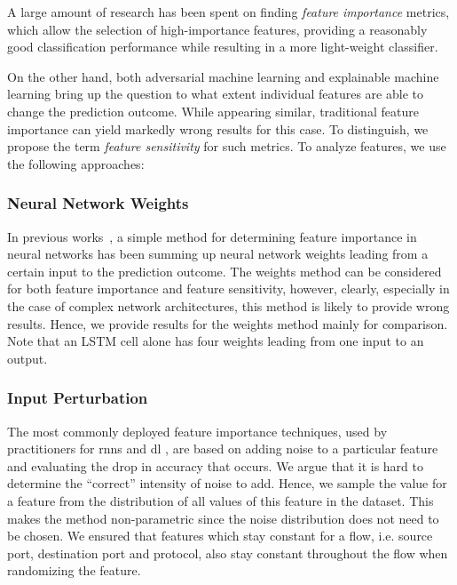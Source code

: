 \documentclass[conference]{IEEEtran}
\begin{document}
A large amount of research has been spent on finding \emph{feature importance} metrics, which allow the selection  of high-importance features, providing a reasonably good classification performance while resulting in a more light-weight classifier.

On the other hand, both adversarial machine learning and explainable machine learning bring up the question to what extent individual features are able to change the prediction outcome. While appearing similar, traditional feature importance can yield markedly wrong results for this case.  To distinguish, we propose the term \emph{feature sensitivity} for such metrics.
To analyze features, we use the following approaches:

\subsubsection{Neural Network Weights}
In previous works~\cite{olden_accurate_2004}, a simple method for determining feature importance in neural networks has been summing up neural network weights leading from a certain input to the prediction outcome. The weights method can be considered for both feature importance and feature sensitivity, however, clearly, especially in the case of complex network architectures, this method is likely to provide wrong results. Hence, we provide results for the weights method mainly for comparison. Note that an LSTM cell alone has four weights leading from one input to an output.

\subsubsection{Input Perturbation}

The most commonly deployed feature importance techniques, used by practitioners for \glspl{rnn} \cite{stackexchange_cross_validated_neural_2019} and \gls{dl} \cite{molnar_interpretable_2019,stackexchange_cross_validated_feature_2016,olden_accurate_2004}, are based on adding noise to a particular feature and evaluating the drop in accuracy that occurs. We argue that it is hard to determine the ``correct'' intensity of noise to add. %
 Hence, we sample the value for a feature from the distribution of all values of this feature in the dataset. This makes the method non-parametric since the noise distribution  does not need to be chosen. We ensured that features which stay constant for a flow, i.e. source port, destination port and protocol, also stay constant throughout the flow when randomizing the feature.
\end{document}
